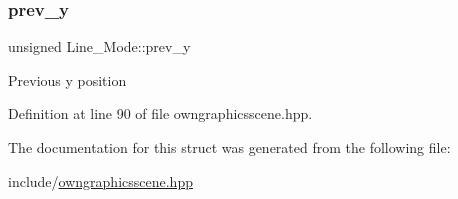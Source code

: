 \subsubsection{\texorpdfstring{prev\+\_\+y}{prev\_y}}
{\footnotesize\ttfamily unsigned Line\+\_\+\+Mode\+::prev\+\_\+y}

Previous y position 

Definition at line 90 of file owngraphicsscene.\+hpp.



The documentation for this struct was generated from the following file\+:\begin{DoxyCompactItemize}
\item 
include/\mbox{\hyperlink{owngraphicsscene_8hpp}{owngraphicsscene.\+hpp}}\end{DoxyCompactItemize}
